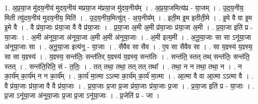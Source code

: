 \documentclass[17pt]{extarticle}
\begin{document}
1. अ॒प्र॒या॒ज मु॑दय॒नीय॑ मुदय॒नीय॑ मप्रया॒ज म॑प्रया॒ज मु॑दय॒नीय᳚म् । . अ॒प्र॒या॒जमित्य॑प्र - या॒जम् । . उ॒द॒य॒नीय॒ मिती त्यु॑दय॒नीय॑ मुदय॒नीय॒ मिति॑ । . उ॒द॒य॒नीय॒मित्यु॑त् - अ॒य॒नीय᳚म् । . इती॒म इ॒म इतीती॒मे । . इ॒मे वै वा इ॒म इ॒मे वै । . वै प्र॑या॒जाः प्र॑या॒जा वै वै प्र॑या॒जाः । . प्र॒या॒जा अ॒मी अ॒मी प्र॑या॒जाः प्र॑या॒जा अ॒मी । . प्र॒या॒जा इति॑ प्र - या॒जाः । . अ॒मी अ॑नूया॒जा अ॑नूया॒जा अ॒मी अ॒मी अ॑नूया॒जाः । . अ॒मी इत्य॒मी । . अ॒नू॒या॒जाः सा सा ऽनू॑या॒जा अ॑नूया॒जाः सा । . अ॒नू॒या॒जा इत्य॑नु - या॒जाः । . सैवैव सा सैव । . ए॒व सा सैवैव सा । . सा य॒ज्ञ्स्य॑ य॒ज्ञ्स्य॒ सा सा य॒ज्ञ्स्य॑ । . य॒ज्ञ्स्य॒ सन्त॑तिः॒ सन्त॑तिर् य॒ज्ञ्स्य॑ य॒ज्ञ्स्य॒ सन्त॑तिः । . सन्त॑ति॒ स्तत् तथ् सन्त॑तिः॒ सन्त॑ति॒ स्तत् । . सन्त॑ति॒रिति॒ सं - त॒तिः॒ । . तत् तथा॒ तथा॒ तत् तत् तथा᳚ । . तथा॒ न न तथा॒ तथा॒ न । . न का॒र्य॑म् का॒र्य॑म् न न का॒र्य᳚म् । . का॒र्य॑ मा॒त्मा ऽऽत्मा का॒र्य॑म् का॒र्य॑ मा॒त्मा । . आ॒त्मा वै वा आ॒त्मा ऽऽत्मा वै । . वै प्र॑या॒जाः प्र॑या॒जा वै वै प्र॑या॒जाः । . प्र॒या॒जाः प्र॒जा प्र॒जा प्र॑या॒जाः प्र॑या॒जाः प्र॒जा । . प्र॒या॒जा इति॑ प्र - या॒जाः । . प्र॒जा ऽनू॑या॒जा अ॑नूया॒जाः प्र॒जा प्र॒जा ऽनू॑या॒जाः । . प्र॒जेति॑ प्र - जा । \newline
\end{document}
